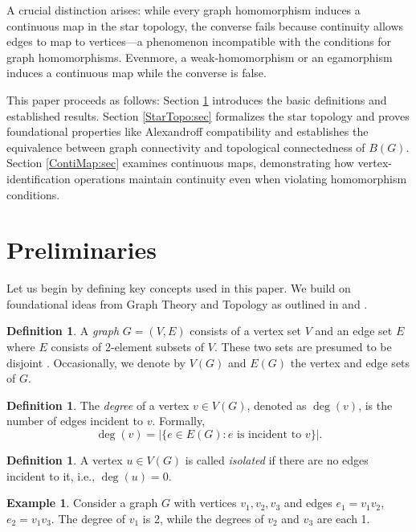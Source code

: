 \documentclass{amsart}
\theoremstyle{definition}
\newtheorem{definition}[theorem]{Definition}
\newtheorem{example}[theorem]{Example}
\theoremstyle{remark}
\numberwithin{equation}{section}
\begin{document}
	A crucial distinction arises: while every graph homomorphism induces a continuous map in the star topology, the converse fails because continuity allows edges to map to vertices—a phenomenon incompatible with the conditions for graph homomorphisms. Evenmore, a weak-homomorphism or an egamorphism induces a continuous map while the converse is false.
	
	This paper proceeds as follows: Section \ref{Prelim:sec} introduces the basic definitions and established results. Section \ref{StarTopo:sec} formalizes the star topology and proves foundational properties like Alexandroff compatibility and establishes the equivalence between graph connectivity and topological connectedness of \( B(G) \). Section \ref{ContiMap:sec} examines continuous maps, demonstrating how vertex-identification operations maintain continuity even when violating homomorphism conditions.
	
	
	\section{Preliminaries}
	\label{Prelim:sec}
	Let us begin by defining key concepts used in this paper. We build on
	foundational ideas from Graph Theory and Topology as outlined in \cite{ChartrandZhang}
	and \cite{Munkres}.
	
	\begin{definition}\cite{ChartrandZhang}
		A \textit{graph} \( G = (V, E) \) consists of a vertex set \( V \) and an
		edge set \( E \) where \(E\) consists of 2-element subsets of \(V\). These two
		sets are presumed to be disjoint \cite{ChartrandZhang}. Occasionally, we denote by
		\(V(G)\) and \(E(G)\) the vertex and edge sets of \(G\). 
	\end{definition}
	
	\begin{definition}\cite{ChartrandZhang}
		The \textit{degree} of a vertex \(v \in V(G)\), denoted as \(\deg(v)\),
		is the number of edges incident to \(v\). Formally,
		\[
		\deg(v) = |\{e \in E(G): e \text{ is incident to } v\}|.
		\]
	\end{definition}
	
	\begin{definition}\cite{ChartrandZhang}
		A vertex \(u \in V(G)\) is called \textit{isolated} if there are no edges
		incident to it, i.e., \(\deg(u) = 0\).
	\end{definition}
	
	\begin{example}
		Consider a graph \(G\) with vertices \(v_1, v_2, v_3\) and edges \(e_1 =
		v_1v_2\), \(e_2 = v_1v_3\). The degree of \(v_1\) is 2, while the degrees of
		\(v_2\) and \(v_3\) are each 1.
	\end{example}
	
\end{document}
